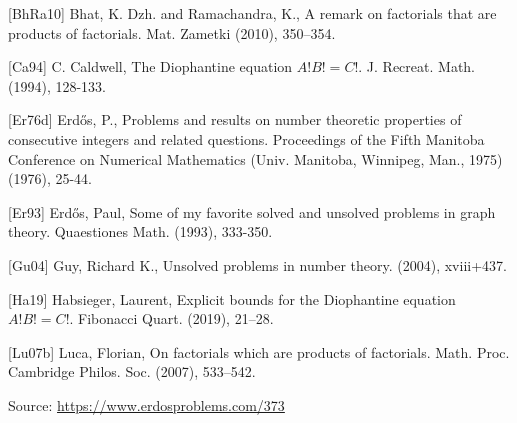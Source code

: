 \documentclass{article}
\begin{document}
[BhRa10] Bhat, K. Dzh. and Ramachandra, K., A remark on factorials that are products of factorials. Mat. Zametki (2010), 350--354.
 
 [Ca94] C. Caldwell, The Diophantine equation $A!B!=C!$. J. Recreat. Math. (1994), 128-133.
 
 [Er76d] Erd\H{o}s, P., Problems and results on number theoretic properties of consecutive integers and related questions. Proceedings of the Fifth Manitoba Conference on Numerical Mathematics (Univ. Manitoba, Winnipeg, Man., 1975) (1976), 25-44.
 
 [Er93] Erd\H{o}s, Paul, Some of my favorite solved and unsolved problems in graph theory. Quaestiones Math. (1993), 333-350.
 
 [Gu04] Guy, Richard K., Unsolved problems in number theory. (2004), xviii+437.
 
 [Ha19] Habsieger, Laurent, Explicit bounds for the {D}iophantine equation {$A!B!=C!$}. Fibonacci Quart. (2019), 21--28.
 
 [Lu07b] Luca, Florian, On factorials which are products of factorials. Math. Proc. Cambridge Philos. Soc. (2007), 533--542.

\bigskip
\noindent\small{Source: \url{https://www.erdosproblems.com/373}}
\end{document}
